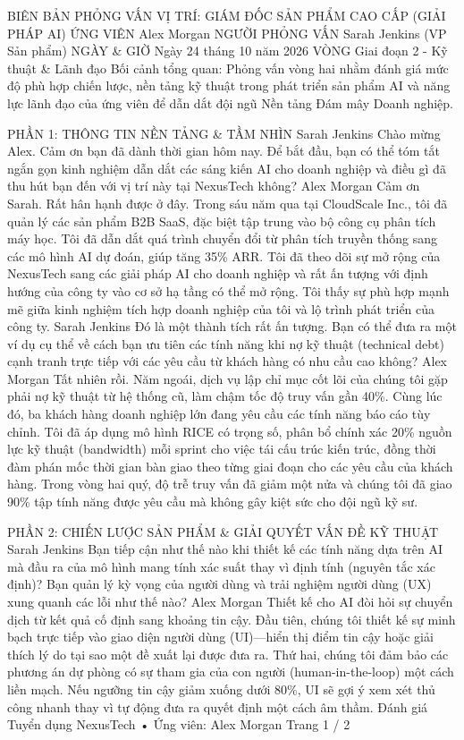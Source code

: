 \documentclass[12pt]{article}
\begin{document}
BIÊN BẢN PHỎNG VẤN
VỊ TRÍ: GIÁM ĐỐC SẢN PHẨM CAO CẤP (GIẢI PHÁP AI)
ỨNG VIÊN
Alex Morgan
NGƯỜI PHỎNG VẤN
Sarah Jenkins (VP Sản phẩm)
NGÀY \& GIỜ
Ngày 24 tháng 10 năm 2026
VÒNG
Giai đoạn 2 - Kỹ thuật \& Lãnh đạo
Bối cảnh tổng quan: Phỏng vấn vòng hai nhằm đánh giá mức độ phù hợp chiến lược, nền tảng kỹ thuật trong phát triển sản phẩm AI và năng lực lãnh đạo của ứng viên để dẫn dắt đội ngũ Nền tảng Đám mây Doanh nghiệp.

PHẦN 1: THÔNG TIN NỀN TẢNG \& TẦM NHÌN
Sarah Jenkins
Chào mừng Alex. Cảm ơn bạn đã dành thời gian hôm nay. Để bắt đầu, bạn có thể tóm tắt ngắn gọn kinh nghiệm dẫn dắt các sáng kiến AI cho doanh nghiệp và điều gì đã thu hút bạn đến với vị trí này tại NexusTech không?
Alex Morgan
Cảm ơn Sarah. Rất hân hạnh được ở đây. Trong sáu năm qua tại CloudScale Inc., tôi đã quản lý các sản phẩm B2B SaaS, đặc biệt tập trung vào bộ công cụ phân tích máy học. Tôi đã dẫn dắt quá trình chuyển đổi từ phân tích truyền thống sang các mô hình AI dự đoán, giúp tăng 35\% ARR. Tôi đã theo dõi sự mở rộng của NexusTech sang các giải pháp AI cho doanh nghiệp và rất ấn tượng với định hướng của công ty vào cơ sở hạ tầng có thể mở rộng. Tôi thấy sự phù hợp mạnh mẽ giữa kinh nghiệm tích hợp doanh nghiệp của tôi và lộ trình phát triển của công ty.
Sarah Jenkins
Đó là một thành tích rất ấn tượng. Bạn có thể đưa ra một ví dụ cụ thể về cách bạn ưu tiên các tính năng khi nợ kỹ thuật (technical debt) cạnh tranh trực tiếp với các yêu cầu từ khách hàng có nhu cầu cao không?
Alex Morgan
Tất nhiên rồi. Năm ngoái, dịch vụ lập chỉ mục cốt lõi của chúng tôi gặp phải nợ kỹ thuật từ hệ thống cũ, làm chậm tốc độ truy vấn gần 40\%. Cùng lúc đó, ba khách hàng doanh nghiệp lớn đang yêu cầu các tính năng báo cáo tùy chỉnh. Tôi đã áp dụng mô hình RICE có trọng số, phân bổ chính xác 20\% nguồn lực kỹ thuật (bandwidth) mỗi sprint cho việc tái cấu trúc kiến trúc, đồng thời đàm phán mốc thời gian bàn giao theo từng giai đoạn cho các yêu cầu của khách hàng. Trong vòng hai quý, độ trễ truy vấn đã giảm một nửa và chúng tôi đã giao 90\% tập tính năng được yêu cầu mà không gây kiệt sức cho đội ngũ kỹ sư.

PHẦN 2: CHIẾN LƯỢC SẢN PHẨM \& GIẢI QUYẾT VẤN ĐỀ KỸ THUẬT
Sarah Jenkins
Bạn tiếp cận như thế nào khi thiết kế các tính năng dựa trên AI mà đầu ra của mô hình mang tính xác suất thay vì định tính (nguyên tắc xác định)? Bạn quản lý kỳ vọng của người dùng và trải nghiệm người dùng (UX) xung quanh các lỗi như thế nào?
Alex Morgan
Thiết kế cho AI đòi hỏi sự chuyển dịch từ kết quả cố định sang khoảng tin cậy. Đầu tiên, chúng tôi thiết kế sự minh bạch trực tiếp vào giao diện người dùng (UI)—hiển thị điểm tin cậy hoặc giải thích lý do tại sao một đề xuất lại được đưa ra. Thứ hai, chúng tôi đảm bảo các phương án dự phòng có sự tham gia của con người (human-in-the-loop) một cách liền mạch. Nếu ngưỡng tin cậy giảm xuống dưới 80\%, UI sẽ gợi ý xem xét thủ công nhanh thay vì tự động đưa ra quyết định một cách âm thầm.
Đánh giá Tuyển dụng NexusTech • Ứng viên: Alex Morgan
Trang 1 / 2
\end{document}
